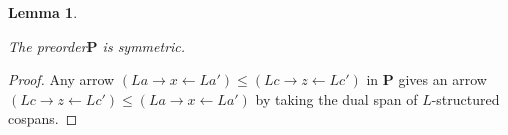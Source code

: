 \documentclass[]{amsart}
\newcommand{\A}{\cat{A}}
\renewcommand{\P}{\cat{P}}
\newcommand{\X}{\cat{X}}
\newcommand{\cat}[1]{\mathbf{#1}}
\newcommand{\diagram}[1]{\raisebox{-0.5\height}{\texttt{[image: \#1]}}}
\newcommand{\RRewrite}{ \mathbb{R}\mathbf{ewrite} }
\newcommand{\edit}[1]{\textcolor{editcolour}{(#1)}}
\newtheorem{lemma}[theorem]{Lemma}
\theoremstyle{remark}
\theoremstyle{definition}
\begin{document}
\begin{lemma} \label{thm:preord-symm}
  
  The preorder$ \P $ is symmetric.
  
\end{lemma}
\begin{proof}
  
  Any arrow $ ( La \to x \gets La' ) \leq ( Lc \to z \gets Lc' ) $ in
  $ \P $ gives an arrow
  $ ( Lc \to z \gets Lc' ) \leq ( La \to x \gets La' ) $ by taking the
  dual span of $ L $-structured cospans.
  
\end{proof}

\end{document}
